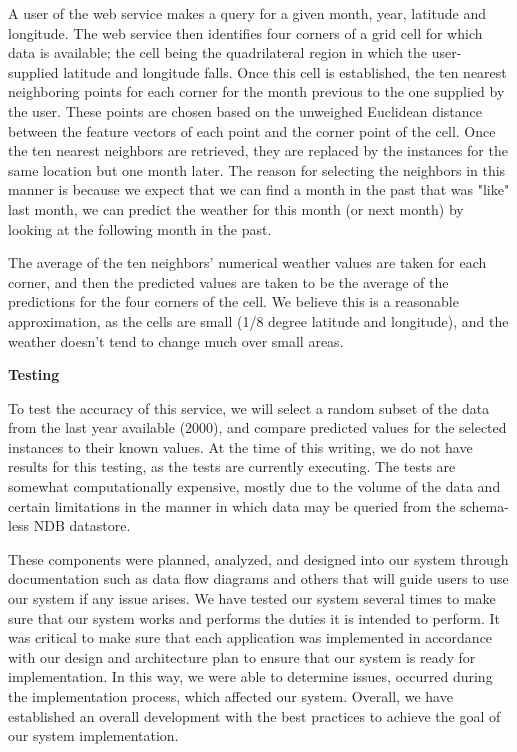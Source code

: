 \documentclass{sig-alternate}
\begin{document}
 			A user of the web service makes a query for a given month, year, latitude and longitude. The 			web service then identifies four corners of a grid cell for which data is available; the 					cell being the quadrilateral region in which the user-supplied latitude and longitude falls. 			Once this cell is established, the ten nearest neighboring points for each corner for the 				month previous to the one supplied by the user. These points are chosen based on the 						unweighed Euclidean distance between the feature vectors of each point and the corner point 				of the cell. Once the ten nearest neighbors are retrieved, they are replaced by the 						instances for the same location but one month later. The reason for selecting the neighbors 				in this manner is because we expect that we can find a month in the past that was "like" 					last month, we can predict the weather for this month (or next month) by looking at the 					following month in the past. \newline

			The average of the ten neighbors' numerical weather values are taken for each corner, and 				then the predicted values are taken to be the average of the predictions for the four 					corners of the cell. We believe this is a reasonable approximation, as the cells are small 				(1/8 degree latitude and longitude), and the weather doesn't tend to change much over small 				areas. \newline

		\textbf{Testing}\newline

			To test the accuracy of this service, we will select a random subset of the data from the 				last year available (2000), and compare predicted values for the selected instances to their 			known values. At the time of this writing, we do not have results for this testing, as the 				tests are currently executing. The tests are somewhat computationally expensive, mostly due 				to the volume of the data and certain limitations in the manner in which data may be queried 			from the schema-less NDB datastore.\newline

		These components were planned, analyzed, and designed into our system through documentation 				such as data flow diagrams and others that will guide users to use our system if any issue 				arises. We have tested our system several times to make sure that our system works and 					performs the duties it is intended to perform. It was critical to make sure that each 					application was implemented in accordance with our design and architecture plan to ensure 				that our system is ready for implementation. In this way, we were able to determine issues, 				occurred during the implementation process, which affected our system. Overall, we have 					established an overall development with the best practices to achieve the goal of our system 				implementation.	\newline	
		
\end{document}
